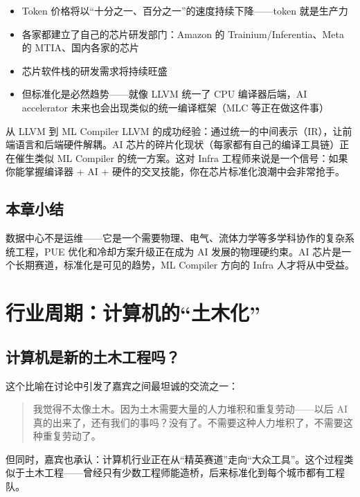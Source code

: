 \documentclass[a4paper]{article}
\begin{document}
\begin{itemize}
    \item Token 价格将以``十分之一、百分之一''的速度持续下降——token 就是生产力
    \item 各家都建立了自己的芯片研发部门：Amazon 的 Trainium/Inferentia、Meta 的 MTIA、国内各家的芯片
    \item 芯片软件栈的研发需求将持续旺盛
    \item 但标准化是必然趋势——就像 LLVM 统一了 CPU 编译器后端，AI accelerator 未来也会出现类似的统一编译框架（MLC 等正在做这件事）
\end{itemize}

\begin{knowledgebox}{从 LLVM 到 ML Compiler}
LLVM 的成功经验：通过统一的中间表示（IR），让前端语言和后端硬件解耦。AI 芯片的碎片化现状（每家都有自己的编译工具链）正在催生类似 ML Compiler 的统一方案。这对 Infra 工程师来说是一个信号：如果你能掌握编译器 + AI + 硬件的交叉技能，你在芯片标准化浪潮中会非常抢手。
\end{knowledgebox}

\subsection{本章小结}

数据中心不是运维——它是一个需要物理、电气、流体力学等多学科协作的复杂系统工程，PUE 优化和冷却方案升级正在成为 AI 发展的物理硬约束。AI 芯片是一个长期赛道，标准化是可见的趋势，ML Compiler 方向的 Infra 人才将从中受益。


\section{行业周期：计算机的``土木化''}

\subsection{计算机是新的土木工程吗？}

这个比喻在讨论中引发了嘉宾之间最坦诚的交流之一：

\begin{quote}
我觉得不太像土木。因为土木需要大量的人力堆积和重复劳动——以后 AI 真的出来了，还有我们的事吗？没有了。不需要这种人力堆积了，不需要这种重复劳动了。
\end{quote}

但同时，嘉宾也承认：计算机行业正在从``精英赛道''走向``大众工具''。这个过程类似于土木工程——曾经只有少数工程师能造桥，后来标准化到每个城市都有工程队。
\end{document}
